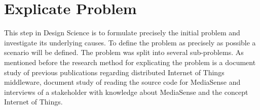\chapter{Explicate Problem}
This step in Design Science \cite{johannesson2012design} is to formulate precisely the initial problem and investigate its underlying causes. To define the problem as precisely as possible a scenario will be defined. The problem was split into several sub-problems. As mentioned before the research method for explicating the problem is a document study of previous publications regarding distributed Internet of Things middleware, document study of reading the source code for MediaSense and interviews of a stakeholder with knowledge about MediaSense and the concept Internet of Things. 




